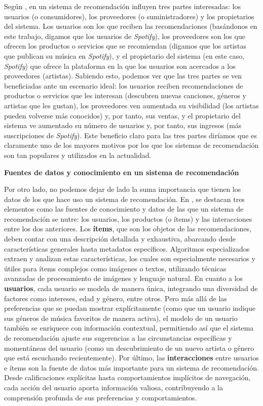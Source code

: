 Según \cite{recommenderintro}, en un sistema de recomendación influyen tres partes interesadas: los usuarios (o consumidores), los proveedores (o suministradores)
y los propietarios del sistema. Los usuarios son los que reciben las recomendaciones (basándonos en este trabajo, digamos que los usuarios de \textit{Spotify}), 
los proveedores son los que ofrecen los productos o servicios que se recomiendan (digamos que los artistas que publican su música en \textit{Spotify}), y
el propietario del sistema (en este caso, \textit{Spotify}) que ofrece la plataforma en la que los usuarios son acercados a los proveedores (artistas). Sabiendo
esto, podemos ver que las tres partes se ven beneficiadas ante un escenario ideal: los usuarios reciben recomendaciones de productos o servicios que les
interesan (descubren nuevas canciones, géneros y artistas que les gustan), los proveedores ven aumentada su visibilidad (los artistas pueden volverse más
conocidos) y, por tanto, sus ventas, y el propietario del sistema ve aumentado su número de usuarios y, por tanto, sus ingresos (más suscripciones de \textit{Spotify}).
Este beneficio claro para las tres partes diríamos que es claramente uno de los mayores motivos por los que los sistemas de recomendación son tan 
populares y utilizados en la actualidad.

\textbf{Fuentes de datos y conocimiento en un sistema de recomendación}

Por otro lado, no podemos dejar de lado la suma importancia que tienen los datos de los que hace uso un sistema de recomendación. En \cite{recommenderintro}, 
se destacan tres elementos como las fuentes de conocimiento y datos de las que un sistema de recomendación se nutre: los usuarios, los productos (o ítems)
y las interacciones entre los dos anteriores. Los \textbf{ítems}, que son los objetos de las recomendaciones, deben contar con una descripción detallada y exhaustiva, 
abarcando desde características generales hasta metadatos específicos. Algoritmos especializados extraen y analizan estas características, los cuales son
especialmente necesarios y útiles para ítems complejos como imágenes o textos, utilizando técnicas avanzadas de procesamiento de imágenes 
y lenguaje natural.
En cuanto a los \textbf{usuarios}, cada usuario se modela de manera única, integrando una diversidad de factores como intereses, edad y género, entre otros. 
Pero más allá de las preferencias que se puedan mostrar explícitamente (como que un usuario indique sus géneros de música favoritos de manera activa),
el modelo de un usuario también se enriquece con información contextual, permitiendo así que el sistema de recomendación ajuste sus sugerencias a las
circunstancias específicas y momentáneas del usuario (como un descubrimiento de un nuevo artista o género que está escuchando recientemente).
Por último, las \textbf{interacciones} entre usuarios e ítems son la fuente de datos más importante para un sistema de recomendación. Desde calificaciones
explícitas hasta comportamientos implícitos de navegación, cada acción del usuario aporta información valiosa, contribuyendo a la comprensión profunda de 
sus preferencias y comportamientos.

